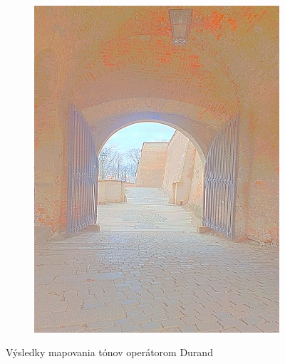 \begin{figure}[h!]
\begin{subfigure}{0.3\textwidth}
      \includegraphics[width=\textwidth]{figures/tests/tmo/dur5}
  \end{subfigure}
  \caption{Výsledky mapovania tónov operátorom Durand}
  \label{fig:durands}
\end{figure}

